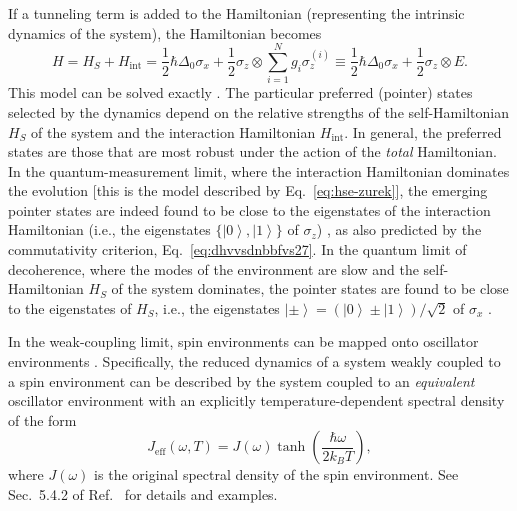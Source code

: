 \documentclass[3p,sort&compress]{elsarticle}
\newcommand{\ket}[1]{\left\vert{#1}\right\rangle}
\newcommand{\op}[1]{#1}
\begin{document}
If a tunneling term is added to the Hamiltonian (representing the intrinsic dynamics of the system), the Hamiltonian becomes
%
\begin{equation}\label{eq:jhdsgwuygfurwb}
  H = \op{H}_S + \op{H}_\text{int} =  \frac{1}{2}\hbar
  \Delta_0 \sigma_x + \frac{1}{2} \sigma_z \otimes
  \sum_{i=1}^N g_i
  \sigma_z^{(i)} 
  \equiv \frac{1}{2}\hbar \Delta_0 \sigma_x + \frac{1}{2}
  \sigma_z \otimes E.
\end{equation}
%
This model can be solved exactly \cite{Dobrovitski:2003:az,Cucchietti:2005:om}. The particular preferred (pointer) states selected by the dynamics depend on the relative strengths of the self-Hamiltonian $\op{H}_S$ of the system and the interaction Hamiltonian $\op{H}_\text{int}$. In general, the preferred states are those that are most robust under the action of the \emph{total} Hamiltonian. In the quantum-measurement limit, where the interaction Hamiltonian dominates the evolution [this is the model described by Eq.~\eqref{eq:hse-zurek}], the emerging pointer states are indeed found to be close to the eigenstates of the interaction Hamiltonian (i.e., the eigenstates $\{\ket{0},\ket{1}\}$ of $\op{\sigma}_z$) \cite{Cucchietti:2005:om}, as also predicted by the commutativity criterion, Eq.~\eqref{eq:dhvvsdnbbfvs27}. In the quantum limit of decoherence, where the modes of the environment are slow and the self-Hamiltonian $\op{H}_S$ of the system dominates, the pointer states are found to be close to the eigenstates of $\op{H}_S$, i.e., the eigenstates $\ket{\pm}=\left(\ket{0}\pm\ket{1}\right)/\sqrt{2}$ of  $\op{\sigma}_x$ \cite{Cucchietti:2005:om}.

In the weak-coupling limit, spin environments can be mapped onto oscillator environments \cite{Feynman:1963:jj,Caldeira:1993:bz}. Specifically, the reduced dynamics of a system weakly coupled to a spin environment can be described by the system coupled to an \emph{equivalent} oscillator environment with an explicitly temperature-dependent spectral density of the form
%
\begin{equation}
\label{eq:vslkfvfgyiJA2}
J_\text{eff}(\omega, T) = J(\omega)
\tanh\left(\frac{\hbar\omega}{2k_B T}\right),
\end{equation}
%
where $J(\omega)$ is the original spectral density of the spin environment. See Sec.~5.4.2 of Ref.~\cite{Schlosshauer:2007:un} for details and examples.
\end{document}
